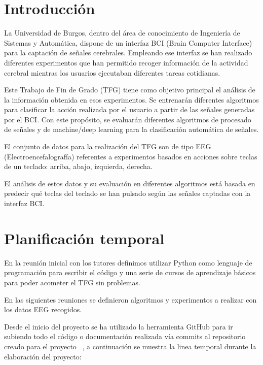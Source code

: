
\section{Introducción}

La Universidad de Burgos, dentro del área de conocimiento de Ingeniería de Sistemas y Automática, dispone de un interfaz BCI (Brain Computer Interface) para la captación de señales cerebrales. 
Empleando ese interfaz se han realizado diferentes experimentos que han permitido recoger información de la actividad cerebral mientras los usuarios ejecutaban diferentes tareas cotidianas. 

Este Trabajo de Fin de Grado (TFG) tiene como objetivo principal el análisis de la información obtenida en esos experimentos. Se entrenarán diferentes algoritmos para clasificar la acción realizada por el usuario a partir de las señales generadas por el BCI. Con este propósito, se evaluarán diferentes algoritmos de procesado de señales y de machine/deep learning para la clasificación automática de señales.

El conjunto de datos para la realización del TFG son de tipo EEG (Electroencefalografía) referentes a experimentos basados en acciones sobre teclas de un teclado: arriba, abajo, izquierda, derecha.

El análisis de estos datos y su evaluación en diferentes algoritmos está basada en predecir qué teclas del teclado se han pulsado según las señales captadas con la interfaz BCI.



\section{Planificación temporal}


En la reunión inicial con los tutores definimos utilizar Python como lenguaje de programación para escribir el código y una serie de cursos de aprendizaje básicos para poder acometer el TFG sin problemas.

En las siguientes reuniones se definieron algoritmos y experimentos a realizar con los datos EEG recogidos.


Desde el inicio del proyecto se ha utilizado la herramienta GitHub para ir subiendo todo el código o documentación realizada vía commits al repositorio creado para el proyecto ~\cite{github:proyecto}, a continuación se muestra la linea temporal durante la elaboración del proyecto:

